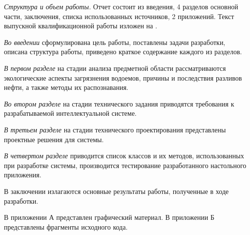 \emph{Структура и объем работы.} Отчет состоит из введения, 4 разделов основной части, заключения, списка использованных источников, 2 приложений. Текст выпускной квалификационной работы изложен на .

\emph{Во введении} сформулирована цель работы, поставлены задачи разработки, описана структура работы, приведено краткое содержание каждого из разделов.

\emph{В первом разделе} на стадии анализа предметной области рассматриваются экологические аспекты загрязнения водоемов, причины и последствия разливов нефти, а также методы их распознавания.

\emph{Во втором разделе} на стадии технического задания приводятся требования к разрабатываемой интеллектуальной системе.

\emph{В третьем разделе} на стадии технического проектирования представлены проектные решения для системы.

\emph{В четвертом разделе} приводится список классов и их методов, использованных при разработке системы, производится тестирование разработанного настольного приложения.

В заключении излагаются основные результаты работы, полученные в ходе разработки.

В приложении А представлен графический материал.
В приложении Б представлены фрагменты исходного кода. 
